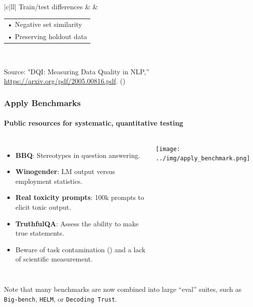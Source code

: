 \documentclass[11pt,
               aspectratio=169,
               hyperref={colorlinks}
               ]{beamer}
\begin{document}
\begin{frame}[t]
\begin{table}[]
\begin{tabular}{|c|ll|}
			Train/test differences &  & \begin{tabular}[c]{@{}l@{}}• Negative set similarity \\ • Preserving holdout data\end{tabular}  \\ \hline
			\end{tabular}
			\end{table}
	
			\centering
			\scriptsize{Source: "DQI: Measuring Data Quality in NLP,”\\\url{https://arxiv.org/pdf/2005.00816.pdf}. (\cite{mishra2020dqi})}
	
	
		\end{frame}
		
		\begin{frame}
			
			\frametitle{Apply Benchmarks}
			\framesubtitle{Public resources for systematic, quantitative testing}
			
			\begin{columns}
				
				\vspace{-5pt}
				\begin{itemize}\small
					\item \textbf{BBQ}: Stereotypes in question answering.
					\item \textbf{Winogender}: LM output versus employment statistics.
					\item \textbf{Real toxicity prompts}: 100k prompts to elicit toxic output.
					\item \textbf{TruthfulQA}: Assess the ability to make true statements.
					\item Beware of task contamination (\cite{li2024task}) and a lack of scientific measurement. 
				\end{itemize}
				\centering
				\newline  \newline  \newline
				\texttt{[image: ../img/apply\_benchmark.png]} 
		
			\end{columns}
			\vspace{10pt}
			\small{Note that many benchmarks are now combined into large ``eval'' suites, such as \texttt{Big-bench}, \texttt{HELM}, or \texttt{Decoding Trust}}.
					
		\end{frame}
		
\end{document}

